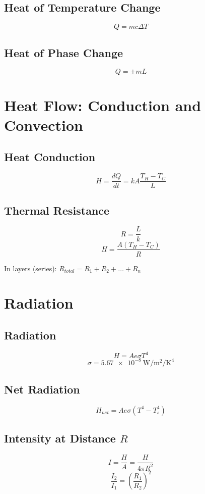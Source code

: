\documentclass{article}
\begin{document}
\subsection{Heat of Temperature Change}
\[Q=mc\Delta T\]

\subsection{Heat of Phase Change}
\[Q=\pm mL\]

\section{Heat Flow: Conduction and Convection}

\subsection{Heat Conduction}
\[H=\frac{dQ}{dt}=kA\frac{T_H-T_C}{L}\]

\subsection{Thermal Resistance}
\[R=\frac{L}{k}\]
\[H=\frac{A(T_H-T_C)}{R}\]
\begin{center}
    In layers (series): $R_{total}=R_1+R_2+\dots+R_n$ \\
\end{center}

\section{Radiation}

\subsection{Radiation}

\[H=Ae\sigma T^4\]
\[\sigma=\SI[per-mode=symbol]{5.67e-8}{\watt\per\meter\squared\per\kelvin\tothe{4}}\]

\subsection{Net Radiation}
\[H_{net}=Ae\sigma(T^4-T_s^4)\]

\subsection{Intensity at Distance $R$}
\[I=\frac{H}{A}=\frac{H}{4\pi R^2}\]
\[\frac{I_2}{I_1}=\left(\frac{R_1}{R_2}\right)^2\]
\end{document}
